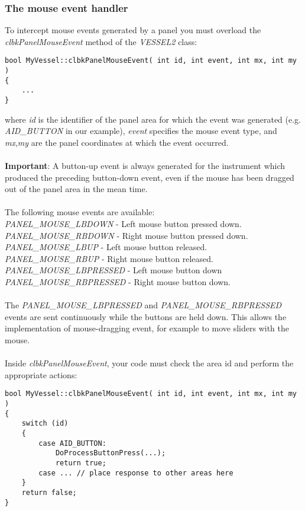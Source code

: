 \documentclass[Orbiter Developer Manual.tex]{subfiles}
\begin{document}
\subsubsection{The mouse event handler}
To intercept mouse events generated by a panel you must overload the \textit{clbkPanelMouseEvent} method of the \textit{VESSEL2} class:

\begin{lstlisting}
bool MyVessel::clbkPanelMouseEvent( int id, int event, int mx, int my )
{
	...
}
\end{lstlisting}

\noindent
where \textit{id} is the identifier of the panel area for which the event was generated (e.g. \textit{AID\_BUTTON} in our example), \textit{event} specifies the mouse event type, and \textit{mx},\textit{my} are the panel coordinates at which the event occurred.\\
\\
\textbf{Important}: A button-up event is always generated for the instrument which produced the preceding button-down event, even if the mouse has been dragged out of the panel area in the mean time.\\
\\
The following mouse events are available:\\
\textit{PANEL\_MOUSE\_LBDOWN} - Left mouse button pressed down.\\
\textit{PANEL\_MOUSE\_RBDOWN} - Right mouse button pressed down.\\
\textit{PANEL\_MOUSE\_LBUP} - Left mouse button released.\\
\textit{PANEL\_MOUSE\_RBUP} - Right mouse button released.\\
\textit{PANEL\_MOUSE\_LBPRESSED} - Left mouse button down\\
\textit{PANEL\_MOUSE\_RBPRESSED} - Right mouse button down.\\
\\
The \textit{PANEL\_MOUSE\_LBPRESSED} and \textit{PANEL\_MOUSE\_RBPRESSED} events are sent continuously while the buttons are held down. This allows the implementation of mouse-dragging event, for example to move sliders with the mouse.\\
\\
Inside \textit{clbkPanelMouseEvent}, your code must check the area id and perform the appropriate actions:

\begin{lstlisting}
bool MyVessel::clbkPanelMouseEvent( int id, int event, int mx, int my )
{
	switch (id)
	{
		case AID_BUTTON:
			DoProcessButtonPress(...);
			return true;
		case ... // place response to other areas here
	}
	return false;
}
\end{lstlisting}
\end{document}
